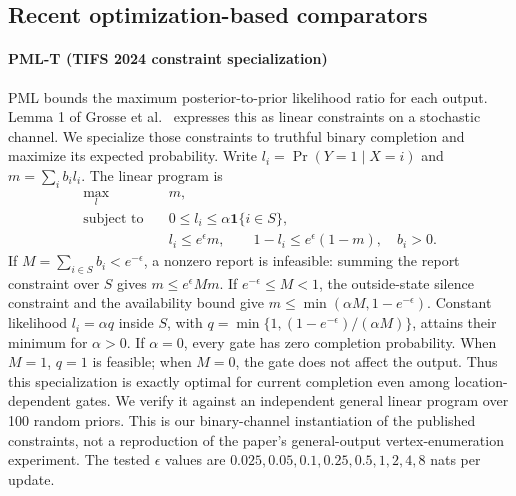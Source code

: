 \documentclass[review,12pt]{elsarticle}
\newcommand{\ind}{\mathbf{1}}
\begin{document}
\subsection{Recent optimization-based comparators}
\label{sec:recentmethods}
\paragraph{PML-T (TIFS 2024 constraint specialization)}
PML bounds the maximum posterior-to-prior likelihood ratio for each output. Lemma 1 of Grosse et al.~\cite{pml2024} expresses this as linear constraints on a stochastic channel. We specialize those constraints to truthful binary completion and maximize its expected probability. Write $l_i=\Pr(Y=1\mid X=i)$ and $m=\sum_i b_i l_i$. The linear program is
\begin{equation}
\begin{aligned}
 \max_l\quad & m,\\
 \text{subject to}\quad &0\le l_i\le\alpha\ind\{i\in S\},\\
 &l_i\le e^\epsilon m,\qquad 1-l_i\le e^\epsilon(1-m),\quad b_i>0.
\end{aligned}
\label{eq:pml}
\end{equation}
If $M=\sum_{i\in S}b_i<e^{-\epsilon}$, a nonzero report is infeasible: summing the report constraint over $S$ gives $m\le e^\epsilon M m$. If $e^{-\epsilon}\le M<1$, the outside-state silence constraint and the availability bound give $m\le\min(\alpha M,1-e^{-\epsilon})$. Constant likelihood $l_i=\alpha q$ inside $S$, with $q=\min\{1,(1-e^{-\epsilon})/(\alpha M)\}$, attains their minimum for $\alpha>0$. If $\alpha=0$, every gate has zero completion probability. When $M=1$, $q=1$ is feasible; when $M=0$, the gate does not affect the output. Thus this specialization is exactly optimal for current completion even among location-dependent gates. We verify it against an independent general linear program over 100 random priors. This is our binary-channel instantiation of the published constraints, not a reproduction of the paper's general-output vertex-enumeration experiment. The tested $\epsilon$ values are $0.025,0.05,0.1,0.25,0.5,1,2,4,8$ nats per update.
\end{document}
